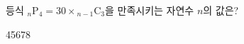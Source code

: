 \hspace*{2mm}\begin{minipage}[t]{\dimexpr\linewidth-2mm\relax}\vspace{0pt}
등식 ${}_n\mathrm{P}_4=30\times{}_{n-1}\mathrm{C}_3$을 만족시키는 자연수 $n$의 값은?
\begin{choices32}{4}{5}{6}{7}{8}\end{choices32}\end{minipage}
